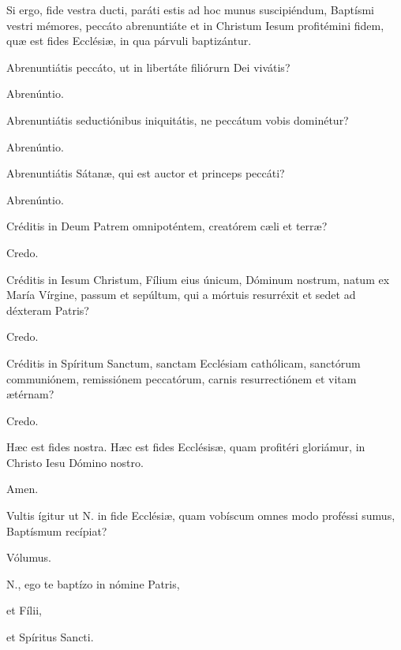 Si ergo, fide vestra ducti, paráti estis ad hoc munus suscipiéndum, Baptísmi
vestri mémores, peccáto abrenuntiáte et in Christum Iesum profitémini
fidem, quæ est fides Ecclésiæ, in qua párvuli baptizántur.

 Abrenuntiátis peccáto, ut in libertáte filiórurn Dei vivátis?

 Abrenúntio.

 Abrenuntiátis seductiónibus iniquitátis, ne peccátum vobis dominétur?

 Abrenúntio.

 Abrenuntiátis Sátanæ, qui est auctor et princeps peccáti?

 Abrenúntio.


Créditis in Deum Patrem omnipoténtem, creatórem cæli et terræ?

 Credo.

 Créditis in Iesum Christum, Fílium eius únicum, Dóminum nostrum, natum ex
María Vírgine, passum et sepúltum, qui a mórtuis resurréxit et sedet ad déxteram Patris?

 Credo.

 Créditis in Spíritum Sanctum, sanctam Ecclésiam cathólicam,
sanctórum communiónem, remissiónem peccatórum, carnis resurrectiónem et vitam ætérnam?

 Credo.

 Hæc est fides nostra. Hæc est fides Ecclésisæ, quam profitéri gloriámur,
in Christo Iesu Dómino nostro.

 Amen.



Vultis ígitur ut {\color{red}N.} in fide Ecclésiæ, quam vobíscum omnes modo proféssi sumus, Baptísmum recípiat?

 Vólumus.


{\color{red}N.}, ego te baptízo in nómine Patris,


et Fílii,


et Spíritus Sancti.

